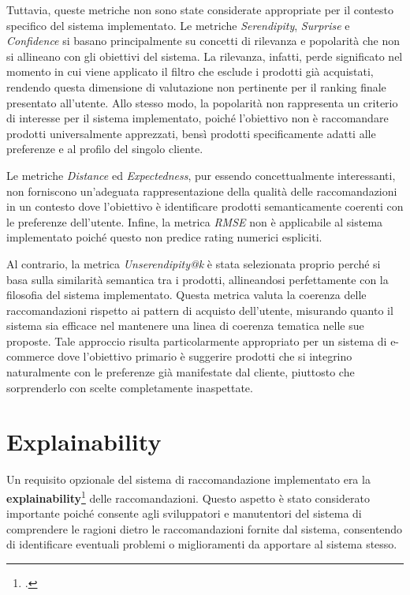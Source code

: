 Tuttavia, queste metriche non sono state considerate appropriate per il contesto specifico del sistema implementato. Le metriche \emph{Serendipity}, \emph{Surprise} e \emph{Confidence} si basano principalmente su concetti di rilevanza e popolarità che non si allineano con gli obiettivi del sistema. La rilevanza, infatti, perde significato nel momento in cui viene applicato il filtro che esclude i prodotti già acquistati, rendendo questa dimensione di valutazione non pertinente per il ranking finale presentato all'utente. Allo stesso modo, la popolarità non rappresenta un criterio di interesse per il sistema implementato, poiché l'obiettivo non è raccomandare prodotti universalmente apprezzati, bensì prodotti specificamente adatti alle preferenze e al profilo del singolo cliente.

Le metriche \emph{Distance} ed \emph{Expectedness}, pur essendo concettualmente interessanti, non forniscono un'adeguata rappresentazione della qualità delle raccomandazioni in un contesto dove l'obiettivo è identificare prodotti semanticamente coerenti con le preferenze dell'utente. Infine, la metrica \emph{RMSE} non è applicabile al sistema implementato poiché questo non predice rating numerici espliciti.

Al contrario, la metrica \emph{Unserendipity@k} è stata selezionata proprio perché si basa sulla similarità semantica tra i prodotti, allineandosi perfettamente con la filosofia del sistema implementato. Questa metrica valuta la coerenza delle raccomandazioni rispetto ai pattern di acquisto dell'utente, misurando quanto il sistema sia efficace nel mantenere una linea di coerenza tematica nelle sue proposte. Tale approccio risulta particolarmente appropriato per un sistema di e-commerce dove l'obiettivo primario è suggerire prodotti che si integrino naturalmente con le preferenze già manifestate dal cliente, piuttosto che sorprenderlo con scelte completamente inaspettate.


\section{Explainability}

Un requisito opzionale del sistema di raccomandazione implementato era la \textbf{\gls{explainability}}\footcite{site:explainable-ai} delle raccomandazioni. Questo aspetto è stato considerato importante poiché consente agli sviluppatori e manutentori del sistema di comprendere le ragioni dietro le raccomandazioni fornite dal sistema, consentendo di identificare eventuali problemi o miglioramenti da apportare al sistema stesso.

